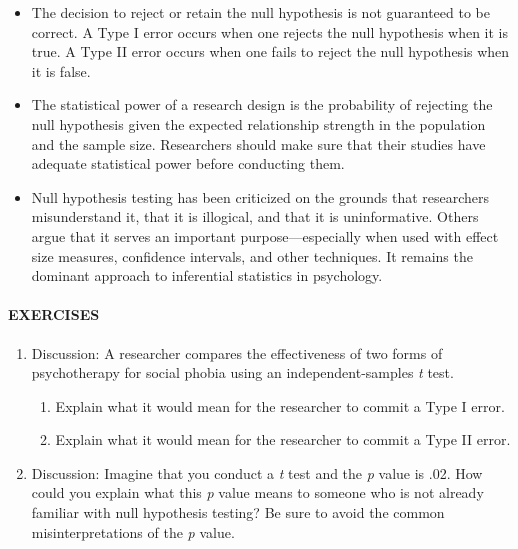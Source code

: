 \documentclass[
]{krantz}
\providecommand{\tightlist}{%
  \setlength{\itemsep}{0pt}\setlength{\parskip}{0pt}}
\begin{document}
\begin{itemize}
\tightlist
\item
  The decision to reject or retain the null hypothesis is not guaranteed to be correct. A Type I error occurs when one rejects the null hypothesis when it is true. A Type II error occurs when one fails to reject the null hypothesis when it is false.
\item
  The statistical power of a research design is the probability of rejecting the null hypothesis given the expected relationship strength in the population and the sample size. Researchers should make sure that their studies have adequate statistical power before conducting them.
\item
  Null hypothesis testing has been criticized on the grounds that researchers misunderstand it, that it is illogical, and that it is uninformative. Others argue that it serves an important purpose---especially when used with effect size measures, confidence intervals, and other techniques. It remains the dominant approach to inferential statistics in psychology.
\end{itemize}

\hypertarget{exercises-32}{%
\paragraph*{EXERCISES}\label{exercises-32}}

\begin{enumerate}
\def\labelenumi{\arabic{enumi}.}
\tightlist
\item
  Discussion: A researcher compares the effectiveness of two forms of psychotherapy for social phobia using an independent-samples \emph{t} test.

  \begin{enumerate}
  \def\labelenumii{\alph{enumii}.}
  \tightlist
  \item
    Explain what it would mean for the researcher to commit a Type I error.
  \item
    Explain what it would mean for the researcher to commit a Type II error.
  \end{enumerate}
\item
  Discussion: Imagine that you conduct a \emph{t} test and the \emph{p} value is .02. How could you explain what this \emph{p} value means to someone who is not already familiar with null hypothesis testing? Be sure to avoid the common misinterpretations of the \emph{p} value.
\end{enumerate}
\end{document}
